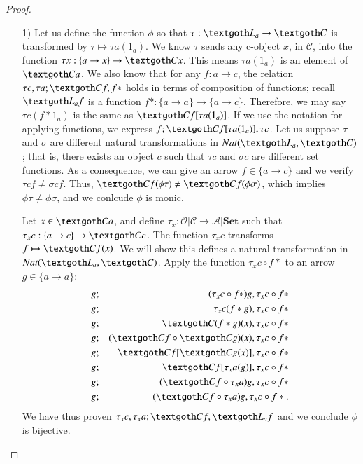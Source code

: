 \documentclass [12pt]{book}
\begin{document}
\begin{proof}\makebox[5pt][]{}\mbox {}\begin{itemize}\item[1)]Let us define the function $\phi$ so that $\tau:\textgoth L_a\rightarrow\textgoth C$ is transformed by $\tau\mapsto\tau a(1_a)$. We know $\tau$ sends any c-object $x$, in $\mathcal C$, into the function $\tau x:\{a\rightarrow x\}\rightarrow\textgoth Cx$. This means $\tau a(1_a)$ is an element of $\textgoth Ca$. We also know that for any $f:a\rightarrow c$, the relation $\tau c,\tau a;\textgoth Cf,f*$ holds in terms of composition of functions; recall $\textgoth L_af$ is a function $f*:\{a\rightarrow a\}\rightarrow\{a\rightarrow c\}$. Therefore, we may say $\tau c(f*1_a)$ is the same as $\textgoth Cf[\tau a(1_a)]$. If we use the notation for applying functions, we express $f;\textgoth Cf[\tau a(1_a)],\tau c$. Let us suppose $\tau $ and $\sigma$ are different natural transformations in $Nat (\textgoth L_a,\textgoth C)$; that is, there exists an object $c$ such that $\tau c$ and $\sigma c$ are different set functions. As a consequence, we can give an arrow $f\in\{a\rightarrow c\}$ and we verify $\tau cf\neq\sigma cf$. Thus, $\textgoth Cf(\phi\tau)\neq\textgoth Cf(\phi\sigma)$, which implies $\phi\tau\neq\phi\sigma$, and we conlcude $\phi$ is monic. 

Let $x\in\textgoth Ca$, and define $\tau_x:\mathcal{O|C}\rightarrow\mathcal A|\textbf{Set}$ such that $\tau_xc:\{a\rightarrow c\}\rightarrow\textgoth Cc$. The function $\tau_xc$ transforms $f\mapsto\textgoth Cf(x)$. We will show this defines a natural transformation in $Nat(\textgoth L_a,\textgoth C)$. Apply the function $\tau_xc\circ f*$ to an arrow $g\in\{a\rightarrow a\}$:\begin{eqnarray}\nonumber g&;&(\tau_xc\circ f*)g,\tau_xc\circ f*\\\nonumber g&;&\tau_xc(f*g),\tau_xc\circ f*\\\nonumber g&;&\textgoth C(f*g)(x),\tau_xc\circ f*\\\nonumber g&;&(\textgoth Cf\circ\textgoth Cg)(x),\tau_xc\circ f*\\\nonumber g&;&\textgoth Cf[\textgoth Cg(x)],\tau_xc\circ f*\\\nonumber g&;&\textgoth Cf[\tau_xa(g)],\tau_xc\circ f*\\\nonumber g&;&(\textgoth Cf\circ\tau_xa)g,\tau_xc\circ f*\\\nonumber g&;&(\textgoth Cf\circ\tau_xa)g,\tau_xc\circ f*.\end{eqnarray}We have thus proven $\tau_xc,\tau_xa;\textgoth Cf,\textgoth L_af$ and we conclude $\phi$ is bijective.


\end{itemize}
\end{proof}
\end{document}
